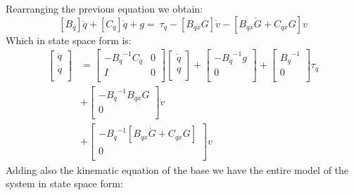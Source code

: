 Rearranging the previous equation we obtain:
\begin{equation}
	\left[B_q\right]\ddot{q}+\left[C_q\right]\dot{q}+g=\ \tau_q-\left[B_{qx}G\right]\dot{v}-\left[B_{qx}\dot{G}+C_{qx}G\right]v
\end{equation}
Which in state space form is:
\begin{equation}
\begin{split}
	\left[\begin{matrix}\ddot{q}\\\dot{q}\\\end{matrix}\right]&=\left[\begin{matrix}-{B_q}^{-1}C_q&0\\I&0\\\end{matrix}\right]\left[\begin{matrix}\dot{q}\\q\\\end{matrix}\right]+\left[\begin{matrix}{{-B}_q}^{-1}g\\0\\\end{matrix}\right]+\left[\begin{matrix}{B_q}^{-1}\\0\\\end{matrix}\right]\tau_q\\&+\left[\begin{matrix}-{B_q}^{-1}B_{qx}G\\0\\\end{matrix}\right]\dot{v}\\&+\left[\begin{matrix}-{B_q}^{-1}\left[B_{qx}\dot{G}+C_{qx}G\right]\\0\\\end{matrix}\right]v
\end{split}
\end{equation}
Adding also the kinematic equation of the base we have the entire model of the system in state space form:
